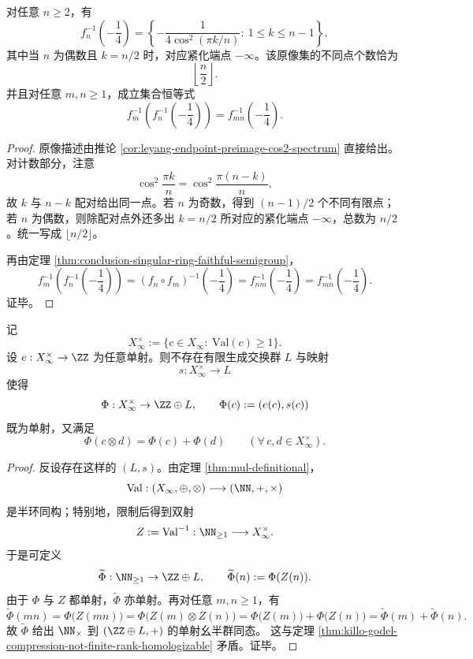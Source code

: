 \begin{theorem}[奇异端点原像塔的紧化乘法律]\label{thm:conclusion-singular-ring-endpoint-preimage-tower}
对任意 \(n\ge 2\)，有
\[
f_n^{-1}\!\left(-\frac14\right)
=
\left\{
-\frac{1}{4\cos^2(\pi k/n)}:\ 1\le k\le n-1
\right\},
\]
其中当 \(n\) 为偶数且 \(k=n/2\) 时，对应紧化端点 \(-\infty\)。该原像集的不同点个数恰为
\[
\left\lfloor\frac{n}{2}\right\rfloor.
\]
并且对任意 \(m,n\ge 1\)，成立集合恒等式
\[
f_m^{-1}\!\left(f_n^{-1}\!\left(-\frac14\right)\right)
=
f_{mn}^{-1}\!\left(-\frac14\right).
\]
\end{theorem}
\begin{proof}
原像描述由推论 \ref{cor:leyang-endpoint-preimage-cos2-spectrum} 直接给出。
对计数部分，注意
\[
\cos^2\!\frac{\pi k}{n}=\cos^2\!\frac{\pi(n-k)}{n},
\]
故 \(k\) 与 \(n-k\) 配对给出同一点。若 \(n\) 为奇数，得到 \((n-1)/2\) 个不同有限点；若 \(n\) 为偶数，则除配对点外还多出 \(k=n/2\) 所对应的紧化端点 \(-\infty\)，总数为 \(n/2\)。统一写成 \(\lfloor n/2\rfloor\)。

再由定理 \ref{thm:conclusion-singular-ring-faithful-semigroup}，
\[
f_m^{-1}\!\left(f_n^{-1}\!\left(-\frac14\right)\right)
=
(f_n\circ f_m)^{-1}\!\left(-\frac14\right)
=
f_{nm}^{-1}\!\left(-\frac14\right)
=
f_{mn}^{-1}\!\left(-\frac14\right).
\]
证毕。
\end{proof}

\begin{theorem}[稳定乘法语义的有限秩账本不可能性]\label{thm:conclusion-stable-multiplication-finite-rank-ledger-impossibility}
记
\[
X_\infty^{\times}:=\{c\in X_\infty:\ \mathrm{Val}(c)\ge 1\}.
\]
设 \(e:X_\infty^{\times}\to\ZZ\) 为任意单射。则不存在有限生成交换群 \(L\) 与映射
\[
s:X_\infty^{\times}\to L
\]
使得
\[
\Phi:X_\infty^{\times}\to \ZZ\oplus L,\qquad
\Phi(c):=(e(c),s(c))
\]
既为单射，又满足
\[
\Phi(c\otimes d)=\Phi(c)+\Phi(d)
\qquad
(\forall\,c,d\in X_\infty^{\times}).
\]
\end{theorem}
\begin{proof}
反设存在这样的 \((L,s)\)。由定理 \ref{thm:mul-definitional}，
\[
\mathrm{Val}:(X_\infty,\oplus,\otimes)\longrightarrow (\NN,+,\times)
\]
是半环同构；特别地，限制后得到双射
\[
Z:=\mathrm{Val}^{-1}:\NN_{\ge 1}\longrightarrow X_\infty^{\times}.
\]
于是可定义
\[
\widetilde\Phi:\NN_{\ge 1}\to \ZZ\oplus L,
\qquad
\widetilde\Phi(n):=\Phi(Z(n)).
\]
由于 \(\Phi\) 与 \(Z\) 都单射，\(\widetilde\Phi\) 亦单射。再对任意 \(m,n\ge 1\)，有
\[
\widetilde\Phi(mn)
=
\Phi\bigl(Z(mn)\bigr)
=
\Phi\bigl(Z(m)\otimes Z(n)\bigr)
=
\Phi\bigl(Z(m)\bigr)+\Phi\bigl(Z(n)\bigr)
=
\widetilde\Phi(m)+\widetilde\Phi(n).
\]
故 \(\widetilde\Phi\) 给出 \(\NN_{\times}\) 到 \((\ZZ\oplus L,+)\) 的单射幺半群同态。
这与定理 \ref{thm:killo-godel-compression-not-finite-rank-homologizable} 矛盾。证毕。
\end{proof}

